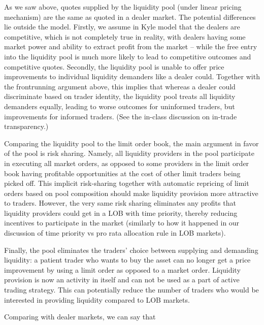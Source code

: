 \begin{solution}
	As we saw above, quotes supplied by the liquidity pool (under linear pricing mechanism) are the same as quoted in a dealer market. The potential differences lie outside the model. Firstly, we assume in Kyle model that the dealers are competitive, which is not completely true in reality, with dealers having some market power and ability to extract profit from the market -- while the free entry into the liquidity pool is much more likely to lead to competitive outcomes and competitive quotes. Secondly, the liquidity pool is unable to offer price improvements to individual liquidity demanders like a dealer could. Together with the frontrunning argument above, this implies that whereas a dealer could discriminate based on trader identity, the liquidity pool treats all liquidity demanders equally, leading to worse outcomes for uninformed traders, but improvements for informed traders. (See the in-class discussion on in-trade transparency.)
	
	Comparing the liquidity pool to the limit order book, the main argument in favor of the pool is risk sharing. Namely, all liquidity providers in the pool participate in executing all market orders, as opposed to some providers in the limit order book having profitable opportunities at the cost of other limit traders being picked off. This implicit risk-sharing together with automatic repricing of limit orders based on pool composition should make liquidity provision more attractive to traders. However, the very same risk sharing eliminates any profits that liquidity providers could get in a LOB with time priority, thereby reducing incentives to participate in the market (similarly to how it happened in our discussion of time priority vs pro rata allocation rule in LOB markets).
	
	Finally, the pool eliminates the traders' choice between supplying and demanding liquidity: a patient trader who wants to buy the asset can no longer get a price improvement by using a limit order as opposed to a market order. Liquidity provision is now an activity in itself and can not be used as a part of active trading strategy. This can potentially reduce the number of traders who would be interested in providing liquidity compared to LOB markets.
	
	Comparing with dealer markets, we can say that 
\end{solution}



\fi





